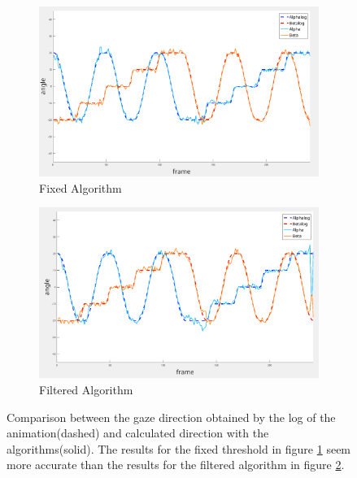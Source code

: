 \begin{figure}
	\begin{subfigure}{.5\textwidth}
		\centering
		\includegraphics[width=\linewidth]{images/fixed_middle.png}
		\caption{Fixed Algorithm}
		\label{fig:fixedMiddle}
	\end{subfigure}
	\begin{subfigure}{.5\textwidth}
		\centering
		\includegraphics[width=\linewidth]{images/normal_middle.png}
		\caption{Filtered Algorithm}
		\label{fig:normalMiddle}
	\end{subfigure}

	\caption{Comparison between the gaze direction obtained by the log of the animation(dashed) and calculated direction with the algorithms(solid). The results for the fixed threshold in figure \ref{fig:fixedMiddle} seem more accurate than the results for the filtered algorithm in figure \ref{fig:normalMiddle}.}
	\label{fig:VGA}
\end{figure}

